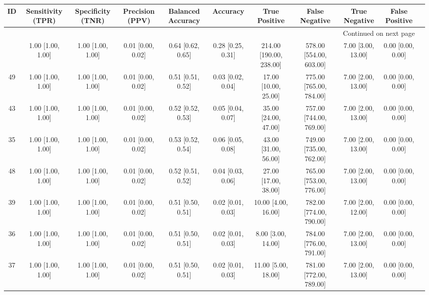 \documentclass[8pt]{article}
\begin{document}
\begin{center}
\begin{footnotesize}
\begin{longtable}{|ccccccccccc|}
\toprule
 ID &  Sensitivity (TPR) &  Specificity (TNR) &    Precision (PPV) &  Balanced Accuracy &           Accuracy &            True Positive &           False Negative &       True Negative &      False Positive \\
\midrule
\endhead
\midrule
\multicolumn{10}{r}{{Continued on next page}} \\
\midrule
\endfoot

\bottomrule
\endlastfoot
 33 &  1.00 [1.00, 1.00] &  1.00 [1.00, 1.00] &  0.01 [0.00, 0.02] &  0.64 [0.62, 0.65] &  0.28 [0.25, 0.31] &  214.00 [190.00, 238.00] &  578.00 [554.00, 603.00] &  7.00 [3.00, 13.00] &   0.00 [0.00, 0.00] \\
 49 &  1.00 [1.00, 1.00] &  1.00 [1.00, 1.00] &  0.01 [0.00, 0.02] &  0.51 [0.51, 0.52] &  0.03 [0.02, 0.04] &     17.00 [10.00, 25.00] &  775.00 [765.00, 784.00] &  7.00 [2.00, 13.00] &   0.00 [0.00, 0.00] \\
 43 &  1.00 [1.00, 1.00] &  1.00 [1.00, 1.00] &  0.01 [0.00, 0.02] &  0.52 [0.52, 0.53] &  0.05 [0.04, 0.07] &     35.00 [24.00, 47.00] &  757.00 [744.00, 769.00] &  7.00 [2.00, 13.00] &   0.00 [0.00, 0.00] \\
 35 &  1.00 [1.00, 1.00] &  1.00 [1.00, 1.00] &  0.01 [0.00, 0.02] &  0.53 [0.52, 0.54] &  0.06 [0.05, 0.08] &     43.00 [31.00, 56.00] &  749.00 [735.00, 762.00] &  7.00 [2.00, 13.00] &   0.00 [0.00, 0.00] \\
 48 &  1.00 [1.00, 1.00] &  1.00 [1.00, 1.00] &  0.01 [0.00, 0.02] &  0.52 [0.51, 0.52] &  0.04 [0.03, 0.06] &     27.00 [17.00, 38.00] &  765.00 [753.00, 776.00] &  7.00 [2.00, 13.00] &   0.00 [0.00, 0.00] \\
 39 &  1.00 [1.00, 1.00] &  1.00 [1.00, 1.00] &  0.01 [0.00, 0.02] &  0.51 [0.50, 0.51] &  0.02 [0.01, 0.03] &      10.00 [4.00, 16.00] &  782.00 [774.00, 790.00] &  7.00 [2.00, 12.00] &   0.00 [0.00, 0.00] \\
 36 &  1.00 [1.00, 1.00] &  1.00 [1.00, 1.00] &  0.01 [0.00, 0.02] &  0.51 [0.50, 0.51] &  0.02 [0.01, 0.03] &       8.00 [3.00, 14.00] &  784.00 [776.00, 791.00] &  7.00 [2.00, 13.00] &   0.00 [0.00, 0.00] \\
 37 &  1.00 [1.00, 1.00] &  1.00 [1.00, 1.00] &  0.01 [0.00, 0.02] &  0.51 [0.50, 0.51] &  0.02 [0.01, 0.03] &      11.00 [5.00, 18.00] &  781.00 [772.00, 789.00] &  7.00 [2.00, 13.00] &   0.00 [0.00, 0.00] \\

\end{longtable}
\end{footnotesize}
\end{center}
\end{document}
